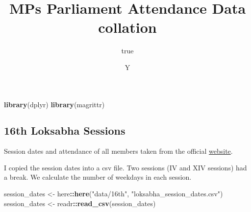 \documentclass[11pt,]{article}
\title{MPs Parliament Attendance Data collation}
\author{true}
\date{Y}
\newenvironment{Shaded}{\begin{snugshade}}{\end{snugshade}}
\newcommand{\KeywordTok}[1]{\textcolor[rgb]{0.13,0.29,0.53}{\textbf{#1}}}
\newcommand{\StringTok}[1]{\textcolor[rgb]{0.31,0.60,0.02}{#1}}
\newcommand{\ControlFlowTok}[1]{\textcolor[rgb]{0.13,0.29,0.53}{\textbf{#1}}}
\newcommand{\OperatorTok}[1]{\textcolor[rgb]{0.81,0.36,0.00}{\textbf{#1}}}
\newcommand{\NormalTok}[1]{#1}
\begin{document}
\maketitle

\begin{Shaded}
\begin{Highlighting}[]
\KeywordTok{library}\NormalTok{(dplyr)}
\KeywordTok{library}\NormalTok{(magrittr)}
\end{Highlighting}
\end{Shaded}

\subsection{16th Loksabha Sessions}\label{th-loksabha-sessions}

Session dates and attendance of all members taken from the official
\href{http://loksabha.nic.in}{website}.

\begin{Shaded}
\end{Shaded}

I copied the session dates into a csv file. Two sessions (IV and XIV
sessions) had a break. We calculate the number of weekdays in each
session.

\begin{Shaded}
\begin{Highlighting}[]
\NormalTok{session_dates <-}\StringTok{ }\NormalTok{here}\OperatorTok{::}\KeywordTok{here}\NormalTok{(}\StringTok{"data/16th"}\NormalTok{, }\StringTok{"loksabha_session_dates.csv"}\NormalTok{)}
\NormalTok{session_dates <-}\StringTok{ }\NormalTok{readr}\OperatorTok{::}\KeywordTok{read_csv}\NormalTok{(session_dates)}
\end{Highlighting}
\end{Shaded}
\end{document}
